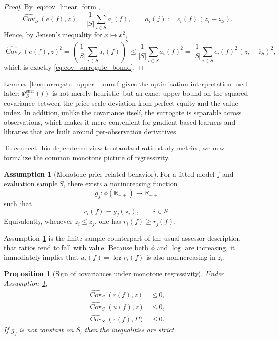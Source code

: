 \documentclass[12pt, draft]{article}
\theoremstyle{plain}
\newtheorem{proposition}{Proposition}
\theoremstyle{definition}
\newtheorem{assumption}{Assumption}
\newcommand{\1}{\mathbf{1}}
\begin{document}
\begin{proof}
By \eqref{eq:cov_linear_form},
\[
\widehat{\operatorname{Cov}}_S(e(f),z)
=
\frac{1}{|S|}
\sum_{i\in S} a_i(f),
\qquad
a_i(f):=e_i(f)\,(z_i-\bar z_S).
\]
Hence, by Jensen's inequality for $x\mapsto x^2$,
\[
\widehat{\operatorname{Cov}}_S(e(f),z)^2
=
\left(
\frac{1}{|S|}
\sum_{i\in S} a_i(f)
\right)^2
\le
\frac{1}{|S|}
\sum_{i\in S} a_i(f)^2
=
\frac{1}{|S|}
\sum_{i\in S} e_i(f)^2\,(z_i-\bar z_S)^2,
\]
which is exactly \eqref{eq:cov_surrogate_bound}.
\end{proof}

Lemma~\ref{lem:surrogate_upper_bound} gives the optimization interpretation used later: $\Psi_S^{\mathrm{surr}}(f)$ is not merely heuristic, but an exact upper bound on the squared covariance between the price-scale deviation from perfect equity and the value index. In addition, unlike the covariance itself, the surrogate is separable across observations, which makes it more convenient for gradient-based learners and libraries that are built around per-observation derivatives.

To connect this dependence view to standard ratio-study metrics, we now formalize the common monotone picture of regressivity.

\begin{assumption}[Monotone price-related behavior]
\label{ass:monotone_regressivity}
For a fitted model $f$ and evaluation sample $S$, there exists a nonincreasing function
\[
g_f:\phi(\mathbb{R}_{++})\to\mathbb{R}_{++}
\]
such that
\[
r_i(f)=g_f(z_i),
\qquad i\in S.
\]
Equivalently, whenever $z_i\le z_j$, one has $r_i(f)\ge r_j(f)$.
\end{assumption}

Assumption~\ref{ass:monotone_regressivity} is the finite-sample counterpart of the usual assessor description that ratios tend to fall with value. Because both $\phi$ and $\log$ are increasing, it immediately implies that $u_i(f)=\log r_i(f)$ is also nonincreasing in $z_i$.

\begin{proposition}[Sign of covariances under monotone regressivity]
\label{prop:cov_signs}
Under Assumption~\ref{ass:monotone_regressivity},
\begin{align}
\widehat{\operatorname{Cov}}_S(r(f),z) &\le 0,
\label{eq:cov_r_z_negative}
\\
\widehat{\operatorname{Cov}}_S(u(f),z) &\le 0,
\label{eq:cov_u_z_negative}
\\
\widehat{\operatorname{Cov}}_S(r(f),P) &\le 0.
\label{eq:cov_r_p_negative}
\end{align}
If $g_f$ is not constant on $S$, then the inequalities are strict.
\end{proposition}
\end{document}
